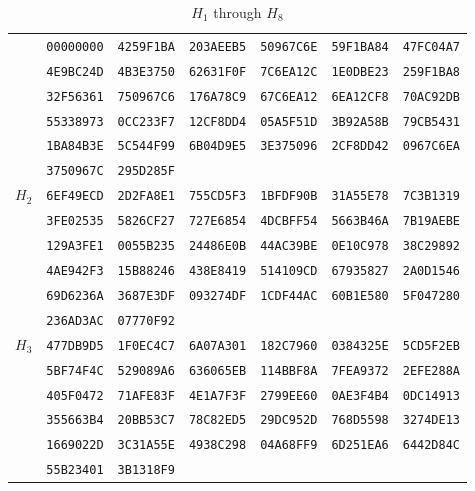 \begin{table}\centering\caption{$H_{1}$ through $H_{8}$}
\begin{tabular}{@{}ccccccc@{}}\toprule\label{table:H32_1}
\multirow{6}{*}{$H_{1}$}
 & \texttt{00000000} & \texttt{4259F1BA} & \texttt{203AEEB5} & \texttt{50967C6E} & \texttt{59F1BA84} & \texttt{47FC04A7}\\
 & \texttt{4E9BC24D} & \texttt{4B3E3750} & \texttt{62631F0F} & \texttt{7C6EA12C} & \texttt{1E0DBE23} & \texttt{259F1BA8}\\
 & \texttt{32F56361} & \texttt{750967C6} & \texttt{176A78C9} & \texttt{67C6EA12} & \texttt{6EA12CF8} & \texttt{70AC92DB}\\
 & \texttt{55338973} & \texttt{0CC233F7} & \texttt{12CF8DD4} & \texttt{05A5F51D} & \texttt{3B92A58B} & \texttt{79CB5431}\\
 & \texttt{1BA84B3E} & \texttt{5C544F99} & \texttt{6B04D9E5} & \texttt{3E375096} & \texttt{2CF8DD42} & \texttt{0967C6EA}\\
 & \texttt{3750967C} & \texttt{295D285F}\\

\midrule
\multirow{6}{*}{$H_{2}$}
 & \texttt{6EF49ECD} & \texttt{2D2FA8E1} & \texttt{755CD5F3} & \texttt{1BFDF90B} & \texttt{31A55E78} & \texttt{7C3B1319}\\
 & \texttt{3FE02535} & \texttt{5826CF27} & \texttt{727E6854} & \texttt{4DCBFF54} & \texttt{5663B46A} & \texttt{7B19AEBE}\\
 & \texttt{129A3FE1} & \texttt{0055B235} & \texttt{24486E0B} & \texttt{44AC39BE} & \texttt{0E10C978} & \texttt{38C29892}\\
 & \texttt{4AE942F3} & \texttt{15B88246} & \texttt{438E8419} & \texttt{514109CD} & \texttt{67935827} & \texttt{2A0D1546}\\
 & \texttt{69D6236A} & \texttt{3687E3DF} & \texttt{093274DF} & \texttt{1CDF44AC} & \texttt{60B1E580} & \texttt{5F047280}\\
 & \texttt{236AD3AC} & \texttt{07770F92}\\

\midrule
\multirow{6}{*}{$H_{3}$}
 & \texttt{477DB9D5} & \texttt{1F0EC4C7} & \texttt{6A07A301} & \texttt{182C7960} & \texttt{0384325E} & \texttt{5CD5F2EB}\\
 & \texttt{5BF74F4C} & \texttt{529089A6} & \texttt{636065EB} & \texttt{114BBF8A} & \texttt{7FEA9372} & \texttt{2EFE288A}\\
 & \texttt{405F0472} & \texttt{71AFE83F} & \texttt{4E1A7F3F} & \texttt{2799EE60} & \texttt{0AE3F4B4} & \texttt{0DC14913}\\
 & \texttt{355663B4} & \texttt{20BB53C7} & \texttt{78C82ED5} & \texttt{29DC952D} & \texttt{768D5598} & \texttt{3274DE13}\\
 & \texttt{1669022D} & \texttt{3C31A55E} & \texttt{4938C298} & \texttt{04A68FF9} & \texttt{6D251EA6} & \texttt{6442D84C}\\
 & \texttt{55B23401} & \texttt{3B1318F9}\\


\end{tabular}
\end{table}
